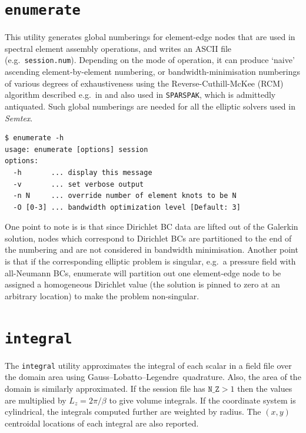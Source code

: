 \documentclass[11pt]{report}
\newcommand{\Semtex}{\emph{Semtex}} \newcommand{\Dog}{\emph{Dog}}
\newcommand{\eg}{e.g.\ } \newcommand{\CC}{\mathrm{c.c.}}
\newcommand\GLL{Gauss--Lobatto--Legendre}
\begin{document}
\section{\texttt{enumerate}}
\label{sec.enumerate}

This utility generates global numberings for element-edge nodes that
are used in spectral element assembly operations, and writes an ASCII
file (\eg \verb|session.num|). Depending on the mode of operation, it
can produce `naive' ascending element-by-element numbering, or
bandwidth-minimisation numberings of various degrees of exhaustiveness
using the Reverse-Cuthill-McKee (RCM) algorithm described \eg in
\citet{george81} and also used in \verb|SPARSPAK|, which is admittedly
antiquated.  Such global numberings are needed for all the elliptic
solvers used in \Semtex.
%
{\small
\begin{verbatim}
$ enumerate -h
usage: enumerate [options] session
options:
  -h       ... display this message
  -v       ... set verbose output
  -n N     ... override number of element knots to be N
  -O [0-3] ... bandwidth optimization level [Default: 3]
\end{verbatim}
}
%
One point to note is is that since Dirichlet BC data are lifted out of
the Galerkin solution, nodes which correspond to Dirichlet BCs are
partitioned to the end of the numbering and are not considered in
bandwidth minimisation.  Another point is that if the corresponding
elliptic problem is singular, \eg a pressure field with all-Neumann
BCs, enumerate will partition out one element-edge node to be assigned
a homogeneous Dirichlet value (\ie the solution is pinned to zero at
an arbitrary location) to make the problem non-singular.

\section{\texttt{integral}}
\label{sec.integral}

The \verb|integral| utility approximates the integral of each scalar
in a field file over the domain area using \GLL\ quadrature.  Also,
the area of the domain is similarly approximated.  If the session file
has $\texttt{N\_Z}>1$ then the values are multiplied by $L_z =
2\pi/\beta$ to give volume integrals.  If the coordinate system is
cylindrical, the integrals computed further are weighted by radius.
The $(x,y)$ centroidal locations of each integral are also reported.
\end{document}

